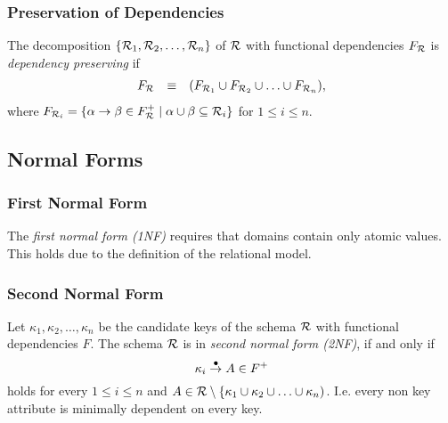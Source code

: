 \subsubsection{Preservation of Dependencies}

The decomposition $\{\mathcal{R}_1,\mathcal{R}_2,\ldots,\mathcal{R}_n\}$ of $\mathcal{R}$ with functional dependencies $F_{\mathcal{R}}$ is \emph{dependency preserving} if
\[ \begin{array}{rcl}
F_{\mathcal{R}} & \equiv & (F_{\mathcal{R}_1} \cup F_{\mathcal{R}_2} \cup \ldots \cup F_{\mathcal{R}_n}),
\end{array} \]
where $F_{\mathcal{R}_i} = \{ \alpha\rightarrow\beta \in F_{\mathcal{R}}^+ \mid \alpha \cup \beta \subseteq \mathcal{R}_i \}$ for $1 \leq i \leq n$.

\todo




\subsection{Normal Forms}




\subsubsection{First Normal Form}

The \emph{first normal form (1NF)} requires that domains contain only atomic values. This holds due to the definition of the relational model.




\subsubsection{Second Normal Form}

Let $\kappa_1, \kappa_2, \ldots, \kappa_n$ be the candidate keys of the schema $\mathcal{R}$ with functional dependencies $F$. The schema $\mathcal{R}$ is in \emph{second normal form (2NF)}, if and only if
\[ \kappa_i \overset{\bullet}{\rightarrow} A \in F^+ \]
holds for every $1 \leq i \leq n$ and $A \in \mathcal{R}\setminus\{\kappa_1\cup\kappa_2\cup\ldots\cup\kappa_n)$. I.e. every non key attribute is minimally dependent on every key.

